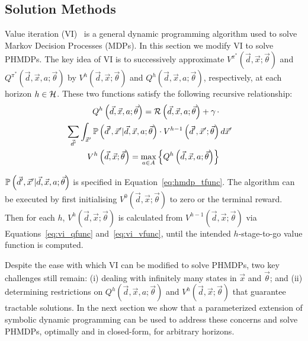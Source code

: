 \subsection{Solution Methods}

Value iteration (VI)~\parencite{Bellman_PU_1957} is a general dynamic programming algorithm used to solve Markov Decision Processes (MDPs). In this section we modify VI to solve PHMDPs. The key idea of VI is to successively approximate {\footnotesize $V^{\pi^{*}}(\vec{d}, \vec{x}; \vec{\theta})$} and {\footnotesize $Q^{\pi^{*}}(\vec{d}, \vec{x}, a; \vec{\theta})$} by {\footnotesize $V^{h}(\vec{d}, \vec{x}; \vec{\theta})$} and
{\footnotesize $Q^{h}(\vec{d}, \vec{x}, a; \vec{\theta})$}, respectively, at each horizon {\footnotesize$h \in \mathcal{H}$}. These two functions satisfy the following recursive relationship:
{\footnotesize 
    \abovedisplayskip=0pt
    \belowdisplayskip=0pt
    \begin{align}
        Q^{h} \left( \vec{d}, \vec{x}, a; \vec{\theta} \right) = \mathcal{R} \left( \vec{d}, \vec{x}, a; \vec{\theta} \right) + \gamma \, \cdot &  \nonumber \\ 
        \sum_{\vec{d}'} \int_{\vec{x}'} \mathbb{P}\left({\vec{d}', \vec{x}' | \vec{d}, \vec{x}, a; \vec{\theta}}\right) \cdot V^{h-1}\left( \vec{d}', \vec{x}'; \vec{\theta} \right) & \, d\vec{x}'  \label{eq:vi_qfunc} \quad \\
        V^{h}\left( \vec{d}, \vec{x}; \vec{\theta} \right) = \max_{a \in A} \left\{ Q^{h}\left( \vec{d}, \vec{x}, a; \vec{\theta} \right) \right\} & \label{eq:vi_vfunc}
    \end{align}
}%

{\footnotesize $\mathbb{P}\left({\vec{d}', \vec{x}' | \vec{d}, \vec{x}, a; \vec{\theta}}\right)$ } is specified in Equation~\eqref{eq:hmdp_tfunc}. The algorithm can be executed by first initialising {\footnotesize   $V^{0}(\vec{d}, \vec{x}; \vec{\theta})$} to zero or the terminal reward. Then for each {\footnotesize$h$}, {\footnotesize $V^{h}(\vec{d}, \vec{x}; \vec{\theta})$} is calculated from {\footnotesize $V^{h-1}(\vec{d}, \vec{x}; \vec{\theta})$} via Equations~\eqref{eq:vi_qfunc} and~\eqref{eq:vi_vfunc}, until the intended $h$-stage-to-go value function is computed.

Despite the ease with which VI can be modified to solve PHMDPs, two key challenges still remain: (i) dealing with infinitely many states in {\footnotesize $\vec{x}$} and {\footnotesize $\vec{\theta}$}; and (ii) determining restrictions on {\footnotesize $Q^{h}(\vec{d}, \vec{x}, a; \vec{\theta})$} and {\footnotesize $V^{h}(\vec{d}, \vec{x}; \vec{\theta})$} that guarantee tractable solutions. In the next section we show that a parameterized extension of symbolic dynamic programming can be used to address these concerns and solve PHMDPs, optimally and in closed-form, for arbitrary horizons.